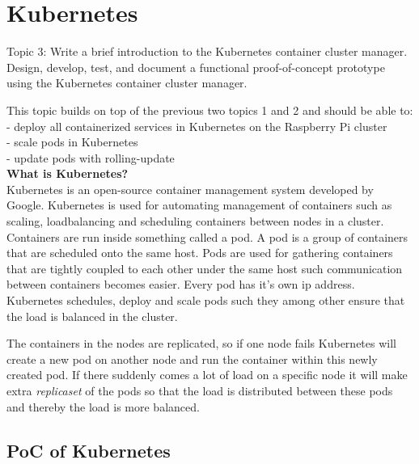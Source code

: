 \chapter{Kubernetes}\label{ch:kubernetes}
Topic 3: Write a brief introduction to the Kubernetes container cluster manager. 
Design, develop, test, and document a functional proof-of-concept prototype using the Kubernetes container cluster manager. 

This topic builds on top of the previous two topics 1 and 2 and should be able to:\\
- deploy all containerized services in Kubernetes on the Raspberry Pi cluster \\
- scale pods in Kubernetes \\
- update pods with rolling-update \\

\textbf{What is Kubernetes?}\\
Kubernetes is an open-source container management system developed by Google.
Kubernetes is used for automating management of containers such as scaling, loadbalancing and scheduling containers between nodes in a cluster. Containers are run inside something called a pod.
A pod is a group of containers that are scheduled onto the same host.
Pods are used for gathering containers that are tightly coupled to each other under the same host such communication between containers becomes easier. Every pod has it's own ip address. Kubernetes schedules, deploy and scale pods such they among other ensure that the load is balanced in the cluster. 

The containers in the nodes are replicated, so if one node fails Kubernetes will create a new pod on another node and run the container within this newly created pod. 
If there suddenly comes a lot of load on a specific node it will make extra \emph{replicaset} of the pods so that the load is distributed between these pods and thereby the load is more balanced. 

\section{PoC of Kubernetes}
